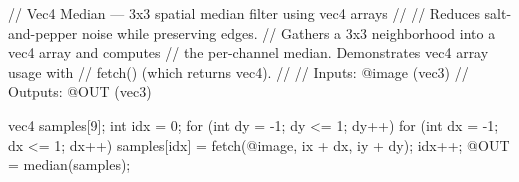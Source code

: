 // Vec4 Median — 3x3 spatial median filter using vec4 arrays
//
// Reduces salt-and-pepper noise while preserving edges.
// Gathers a 3x3 neighborhood into a vec4 array and computes
// the per-channel median. Demonstrates vec4 array usage with
// fetch() (which returns vec4).
//
// Inputs:  @image (vec3)
// Outputs: @OUT   (vec3)

vec4 samples[9];
int idx = 0;
for (int dy = -1; dy <= 1; dy++) {
    for (int dx = -1; dx <= 1; dx++) {
        samples[idx] = fetch(@image, ix + dx, iy + dy);
        idx++;
    }
}
@OUT = median(samples);
